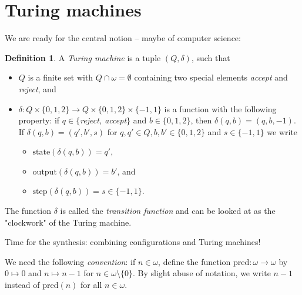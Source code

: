 \documentclass[12pt, a4paper]{amsart}
\theoremstyle{definition}
\newtheorem{definition}[lemma]{Definition}
\begin{document}
\section{Turing machines}
We are ready for the central notion -- maybe of computer science:

\begin{definition}
A {\em Turing machine} is a tuple $(Q, \delta)$, such that 
\begin{itemize}
\item $Q$ is a finite set 
    with $Q\cap \omega = \emptyset$ containing two special elements
{\em accept} and {\em reject}, and
\item $\delta: Q\times \{0,1,2\} \to Q \times \{0,1,2\} \times \{-1,1\}$ is a function 
    with the following property: if $q \in \{${\em reject, accept}$\}$ 
        and $b\in \{0,1,2\}$, then $\delta(q,b) = (q,b,-1)$.
        If $\delta(q,b) = (q', b', s)$ for $q,q'\in Q, b,b'\in \{0,1,2\}$ and 
        $ s\in \{-1,1\}$
        we write
        \begin{itemize}
            \item $\text{state}(\delta(q,b)) = q'$,
            \item $\text{output}(\delta(q,b)) = b'$, and
            \item $\text{step}(\delta(q,b)) = s\in\{-1,1\}$. 
        \end{itemize}
\end{itemize}
    The function $\delta$ is called the {\em transition function} and can 
    be looked at as the "clockwork" of the Turing machine.
\end{definition}

Time for the synthesis: combining configurations and Turing machines!

We need the following {\em convention}: if $n\in\omega$, define the function 
$\text{pred}:\omega\to \omega$ by $0 \mapsto 0$ and $n \mapsto n-1$ for $n\in\omega
\setminus\{0\}$. By slight abuse of notation, we write $n-1$ instead of 
$\text{pred}(n)$ for all $n\in \omega$.
\end{document}
